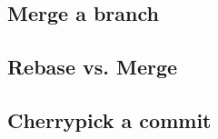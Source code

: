 \subsection{Merge a branch}
\begin{frame}[fragile]
    \subslidetitle
\end{frame}

\subsection{Rebase vs. Merge}
\begin{frame}[fragile]
    \subslidetitle
\end{frame}

\subsection{Cherrypick a commit}
\begin{frame}[fragile]
    \subslidetitle
\end{frame}

